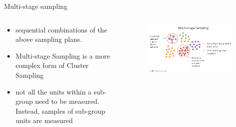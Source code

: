 \documentclass[10pt, compress]{beamer}
\begin{document}
\begin{frame}[t]{Multi-stage sampling}
    \begin{columns}
        \begin{block}{}
            \begin{itemize}
                \item sequential combinations of the above sampling plans.
                \item Multi-stage Sampling is a more complex form of Cluster Sampling
                \item not all the units within a sub-group need to be measured. Instead, samples of sub-group units are measured
            \end{itemize}
        \end{block}
        \begin{block}{}
            \begin{figure}
                \begin{center}
                    \includegraphics[scale=0.25]{img/Slide6.png}
                \end{center}
            \end{figure}
        \end{block}
    \end{columns}

\end{frame}
\end{document}
